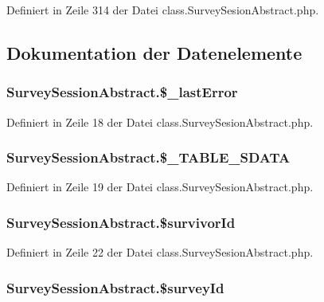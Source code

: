 Definiert in Zeile 314 der Datei class.SurveySesionAbstract.php.

\subsection{Dokumentation der Datenelemente}
\subsubsection{\setlength{\rightskip}{0pt plus 5cm}SurveySessionAbstract.\$\_\-lastError}\label{classSurveySessionAbstract_83135ce2c930d14e48299f95120ac4bf}




Definiert in Zeile 18 der Datei class.SurveySesionAbstract.php.
\subsubsection{\setlength{\rightskip}{0pt plus 5cm}SurveySessionAbstract.\$\_\-TABLE\_\-SDATA}\label{classSurveySessionAbstract_c7e8edbfe6baa4b6533df4f51bcd016d}




Definiert in Zeile 19 der Datei class.SurveySesionAbstract.php.
\subsubsection{\setlength{\rightskip}{0pt plus 5cm}SurveySessionAbstract.\$survivorId}\label{classSurveySessionAbstract_e64aa01fa07e2fed3f5be7aa858ce591}




Definiert in Zeile 22 der Datei class.SurveySesionAbstract.php.
\subsubsection{\setlength{\rightskip}{0pt plus 5cm}SurveySessionAbstract.\$surveyId}\label{classSurveySessionAbstract_0ef1e581ed4e7be90d3de8889ecb953c}




